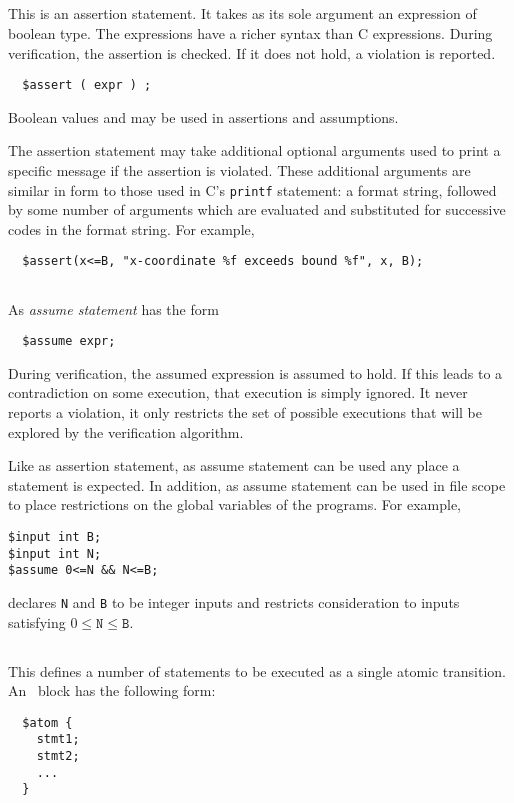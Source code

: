 \subsection{\cassert} This is an assertion statement.  It takes as its
sole argument an expression of boolean type.  The expressions have a
richer syntax than C expressions.  During verification, the assertion
is checked.  If it does not hold, a violation is reported.
\begin{verbatim}
  $assert ( expr ) ;
\end{verbatim}
Boolean values \ctrue{} and \cfalse{} may be used in assertions
and assumptions.

The assertion statement may take additional optional arguments
used to print a specific message if the assertion is violated.
These additional arguments are similar in form to those used
in C's \texttt{printf} statement: a format string, followed by
some number of arguments which are evaluated and substituted
for successive codes in the format string.  For example,
\begin{verbatim}
  $assert(x<=B, "x-coordinate %f exceeds bound %f", x, B); 
\end{verbatim}


\subsection{\cassume} As \emph{assume statement} has the form
\begin{verbatim}
  $assume expr;
\end{verbatim}
During verification, the assumed expression is assumed to hold.  If
this leads to a contradiction on some execution, that execution is
simply ignored.  It never reports a violation, it only restricts the
set of possible executions that will be explored by the verification
algorithm.

Like as assertion statement, as assume statement can be used any place
a statement is expected.  In addition, as assume statement can be used
in file scope to place restrictions on the global variables of the
programs.  For example,
\begin{verbatim}
$input int B;
$input int N;
$assume 0<=N && N<=B;
\end{verbatim}
declares \texttt{N} and \texttt{B} to be integer inputs and restricts
consideration to inputs satisfying $0\leq\texttt{N}\leq\texttt{B}$.

\subsection{\catom} This defines a number of statements to be executed
as a single atomic transition.  An \catom~block has the following
form:
\begin{verbatim}
  $atom {
    stmt1;
    stmt2;
    ...
  }
\end{verbatim}

